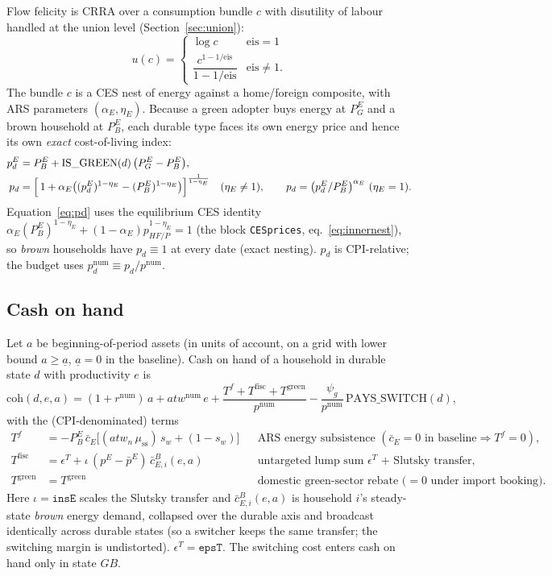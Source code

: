 \documentclass[11pt]{article}
\newcommand{\num}{\mathrm{num}}
\newcommand{\stst}{\mathrm{ss}}
\newcommand{\PEB}{P^{E}_{B}}
\newcommand{\PEG}{P^{E}_{G}}
\newcommand{\pE}{p^{E}}
\newcommand{\coh}{\mathrm{coh}}
\begin{document}
Flow felicity is CRRA over a consumption bundle $c$ with disutility of labour
handled at the union level (Section~\ref{sec:union}):
\begin{equation}
u(c)=\begin{cases}\log c & \text{eis}=1\\[2pt]
\dfrac{c^{1-1/\text{eis}}}{1-1/\text{eis}} & \text{eis}\neq 1.\end{cases}
\end{equation}
The bundle $c$ is a CES nest of energy against a home/foreign composite, with
ARS parameters $(\alpha_E,\eta_E)$. Because a green adopter buys energy at $\PEG$
and a brown household at $\PEB$, each durable type faces its own energy price and
hence its own \emph{exact} cost-of-living index:
\begin{align}
\pE_d &= \PEB + \mathrm{IS\_GREEN}(d)\,\bigl(\PEG-\PEB\bigr),\\
p_d &= \Bigl[\,1+\alpha_E\bigl((\pE_d)^{1-\eta_E}-(\PEB)^{1-\eta_E}\bigr)\Bigr]^{\frac{1}{1-\eta_E}}
\quad(\eta_E\neq 1),\qquad
p_d=\bigl(\pE_d/\PEB\bigr)^{\alpha_E}\ (\eta_E=1).
\label{eq:pd}
\end{align}
Equation~\eqref{eq:pd} uses the equilibrium CES identity
$\alpha_E(\PEB)^{1-\eta_E}+(1-\alpha_E)p_{HF/P}^{1-\eta_E}=1$
(the block \texttt{CESprices}, eq.~\eqref{eq:innernest}), so \emph{brown}
households have $p_d\equiv 1$ at every date (exact nesting). $p_d$ is
CPI-relative; the budget uses $p_d^{\num}\equiv p_d/p^{\num}$.

\subsection{Cash on hand}\label{sec:coh}

Let $a$ be beginning-of-period assets (in units of account, on a grid with lower
bound $a\ge \underline a$, $\underline a=0$ in the baseline). Cash on hand of a
household in durable state $d$ with productivity $e$ is
\begin{equation}
\coh(d,e,a)=(1+r^{\num})\,a+atw^{\num}\,e
+\frac{T^{f}+T^{\text{fisc}}+T^{\text{green}}}{p^{\num}}
-\frac{\psi_g}{p^{\num}}\,\mathrm{PAYS\_SWITCH}(d),
\label{eq:coh}
\end{equation}
with the (CPI-denominated) terms
\begin{align}
T^{f} &= -\PEB\,\bar c_E\bigl[(atw_n\,\mu_{\stst})\,s_w+(1-s_w)\bigr]
&& \text{ARS energy subsistence } (\bar c_E=0\text{ in baseline}\Rightarrow T^f=0),\\
T^{\text{fisc}} &= \epsilon^{T}+\iota\,(\pE-\bar\pE)\,\bar c^{B}_{E,i}(e,a)
&& \text{untargeted lump sum }\epsilon^T\text{ + Slutsky transfer,}\\
T^{\text{green}} &= T^{\text{green}}
&& \text{domestic green-sector rebate (}=0\text{ under import booking).}
\end{align}
Here $\iota=\texttt{insE}$ scales the Slutsky transfer and
$\bar c^{B}_{E,i}(e,a)$ is household $i$'s steady-state \emph{brown} energy
demand, collapsed over the durable axis and broadcast identically across durable
states (so a switcher keeps the same transfer; the switching margin is
undistorted). $\epsilon^{T}=\texttt{epsT}$. The switching cost enters
cash on hand only in state $GB$.
\end{document}
